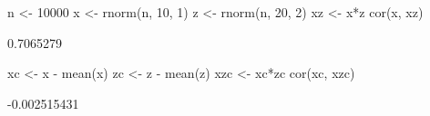 \begin{Schunk}
\begin{Sinput}
 n <- 10000
 x <- rnorm(n, 10, 1)
 z <- rnorm(n, 20, 2)
 xz <- x*z
 cor(x, xz)
\end{Sinput}
\begin{Soutput}
[1] 0.7065279
\end{Soutput}
\begin{Sinput}
 xc <- x - mean(x)
 zc <- z - mean(z)
 xzc <- xc*zc
 cor(xc, xzc)
\end{Sinput}
\begin{Soutput}
[1] -0.002515431
\end{Soutput}
\end{Schunk}
